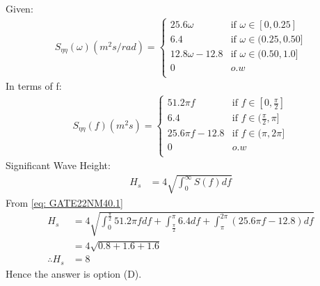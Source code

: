 \documentclass[journal,12pt,onecolumn]{IEEEtran}
\theoremstyle{remark}
\begin{document}
\solution
Given:
\begin{align}
S_{\eta \eta}(\omega)(m^2s/rad) = 
\begin{cases}
  25.6\omega   & \text{if } \omega \in [0,0.25] \\
  6.4  & \text{if } \omega \in (0.25,0.50] \\
  12.8\omega-12.8  & \text{if } \omega \in (0.50,1.0] \\
  0  & o.w \\
\end{cases}
\end{align}
In terms of f:
\begin{align}
S_{\eta \eta}(f)(m^2s) = 
\begin{cases}
  51.2\pi f   & \text{if } f \in [0,\frac{\pi}{2}] \\
  6.4  & \text{if } f \in (\frac{\pi}{2},\pi] \\
  25.6\pi f-12.8  & \text{if } f \in (\pi,2\pi] \\
  0 & o.w \\
\end{cases} \label{eq: GATE22NM40.1}
\end{align}
Significant Wave Height:
\begin{align}
H_s &= 4 \sqrt{\int_{0}^{\infty} S(f)df}
\end{align}
From \eqref{eq: GATE22NM40.1}
\begin{align}
H_s &= 4 \sqrt{\int_{0}^{\frac{\pi}{2}} 51.2\pi fdf + \int_{\frac{\pi}{2}}^{\pi} 6.4df + \int_{\pi}^{2\pi} (25.6\pi f-12.8)df} \\
&= 4 \sqrt{0.8 +1.6 +1.6} \\
\therefore H_s &= 8
\end{align}
Hence the answer is option (D).
%

\end{document}
